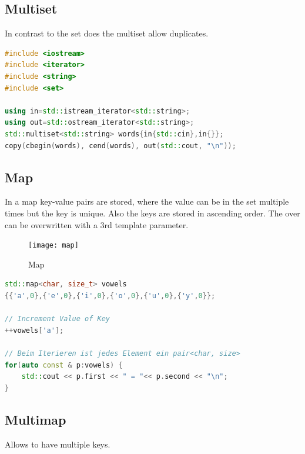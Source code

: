 \subsection{Multiset}
In contrast to the set does the multiset allow duplicates.
\begin{lstlisting}[language=C++]
#include <iostream>
#include <iterator>
#include <string>
#include <set>

using in=std::istream_iterator<std::string>;
using out=std::ostream_iterator<std::string>;
std::multiset<std::string> words{in{std::cin},in{}};
copy(cbegin(words), cend(words), out(std::cout, "\n"));
\end{lstlisting}

\subsection{Map}
In a map key-value pairs are stored, where the value can be in the set multiple times but the key is unique. Also the keys are stored in ascending order. The over can be overwritten with a 3rd template parameter.
\begin{figure}[h!]
  \centering
  \texttt{[image: map]}
  \caption{Map}
\end{figure}
\begin{lstlisting}[language=C++]
std::map<char, size_t> vowels
{{'a',0},{'e',0},{'i',0},{'o',0},{'u',0},{'y',0}};

// Increment Value of Key
++vowels['a'];

// Beim Iterieren ist jedes Element ein pair<char, size>
for(auto const & p:vowels) {
	std::cout << p.first << " = "<< p.second << "\n";
}
\end{lstlisting}

\subsection{Multimap}
Allows to have multiple keys.
